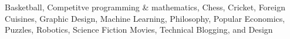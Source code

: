 
{%
	Basketball, Competitve programming \& mathematics, Chess, Cricket, Foreign Cuisines, Graphic Design, Machine Learning, Philosophy, Popular Economics, Puzzles, Robotics, Science Fiction Movies, Technical Blogging, and  Design
}